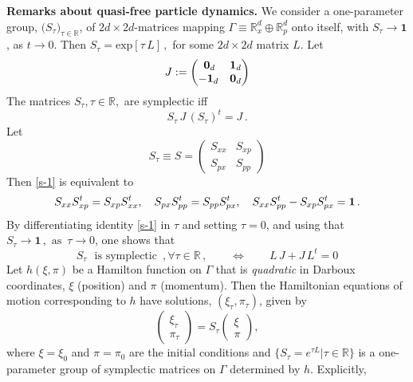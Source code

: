 \documentclass[12pt]{article}
\begin{document}
\noindent
{\bf{Remarks about quasi-free particle dynamics.}} 
We consider a one-parameter group, $\big(S_{\tau}\big)_{ \tau\in \mathbb{R}}$, of $2d\times 2d$-matrices mapping \mbox{$\Gamma \equiv \mathbb{R}^{d}_{x}\oplus \mathbb{R}^{d}_{p}$} onto itself, with $S_{\tau} \rightarrow \mathbf{1}$, as $t\rightarrow 0$. Then $S_{\tau}= \text{exp}[\tau\, L]\,,$ for some $2d\times 2d$ matrix $L$. Let
$$J:=\begin{pmatrix} {\,\bf{0}}_{d}& {\bf{1}}_{d}\\ -{\bf{1}}_{d} & {\bf{0}}_{d} \end{pmatrix}$$
The matrices $S_{\tau}, \tau \in \mathbb{R},$ are symplectic iff
\begin{equation}\label{s-1}
S_{\tau} \,J \,(S_{\tau})^{t} =J\,.
\end{equation}
Let $$S_{\tau}\equiv S = \begin{pmatrix} S_{xx}&S_{xp}\\S_{px}&S_{pp} \end{pmatrix}$$
Then \eqref{s-1} is equivalent to
\begin{equation}\label{ABCD_constr}
S_{xx} S_{xp}^t = S_{xp} S_{xx}^t, \quad S_{px} S_{pp}^t = S_{pp} S_{px}^t, \quad S_{xx} S_{pp}^t - S_{xp} S_{px}^t = {\bf{1}}\,.
\end{equation}
By differentiating identity \eqref{s-1} in $\tau$ and setting $\tau=0$, and using that $S_{\tau}\rightarrow \mathbf{1}\,, \text{ as }\, \tau \rightarrow 0$, one shows that 
\begin{equation}\label{Symplec}
S_{\tau} \,\, \text{ is symplectic }\,, \forall \tau \in \mathbb{R}\,, \qquad \Leftrightarrow \qquad L\,J + J\,L^{t}=0
\end{equation}
Let $h(\xi, \pi)$ be a Hamilton function on $\Gamma$ that is \textit{quadratic} in Darboux coordinates, $\xi$ (position)  and 
$\pi$ (momentum). Then the Hamiltonian equations of motion corresponding to $h$ have solutions, $(\xi_{\tau}, \pi_{\tau})$, given by
\begin{equation}\label{ham}
\begin{pmatrix} \xi_{\tau}\\ \pi_{\tau} \end{pmatrix}= S_{\tau} \begin{pmatrix} \xi\\ \pi \end{pmatrix},
\end{equation}
where $\xi=\xi_0$ and $\pi=\pi_0$ are the initial conditions and $\big\{S_{\tau}=e^{\tau L} \vert \tau \in \mathbb{R}\big\}$ is a one-parameter group of symplectic matrices on $\Gamma$ determined by $h$. Explicitly, 
\end{document}
